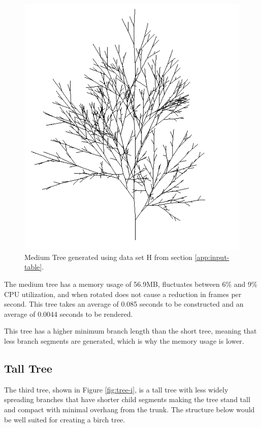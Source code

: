 \documentclass[final]{cmpreport}
\begin{document}
\begin{figure}[ht]
    \includegraphics[scale=0.7]{tree-h.PNG} 
    \centering
    \captionsetup{justification=centering}
    \caption{Medium Tree generated using data set H from section \ref{app:input-table}.}
    \label{fig:tree-h}
\end{figure}

The medium tree has a memory usage of 56.9MB, fluctuates between 6\% and 
9\% CPU utilization, and when rotated does not cause a reduction in frames per second. This tree 
takes an average of 0.085 seconds to be constructed and an average of 0.0044 seconds to be rendered. 

This tree has a higher minimum branch length than the short tree, meaning that less branch 
segments are generated, which is why the memory usage is lower.

\pagebreak
\subsection{Tall Tree}
The third tree, shown in Figure \ref{fig:tree-i}, is a tall tree with less widely spreading 
branches that have shorter child segments making the tree stand tall and compact with minimal 
overhang from the trunk. The structure below would be well suited for creating a birch tree.
\end{document}
